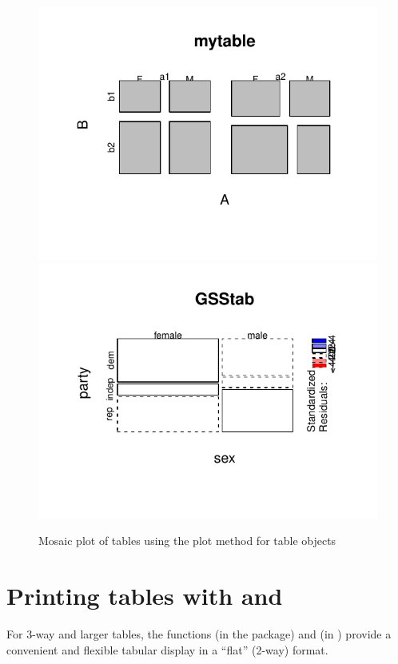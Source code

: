 \documentclass[11pt]{book}
\renewenvironment{knitrout}{\small\renewcommand{\baselinestretch}{.85}}{} %
\begin{document}
\begin{knitrout}
\color{fgcolor}\begin{kframe}
\begin{alltt}
 \hlstd{=}\hlstd{)}
\end{alltt}
\end{kframe}\begin{figure}[!htbp]


\centerline{\includegraphics[width=.48\textwidth]{ch02/fig/plot-xtab1} 
\includegraphics[width=.48\textwidth]{ch02/fig/plot-xtab2} }

\caption[Mosaic plot of tables using the plot method for table objects]{Mosaic plot of tables using the plot method for table objects\label{fig:plot-xtab}}
\end{figure}


\end{knitrout}



\section[Printing tables: structable and ftable]{Printing tables with  and }\label{sec:structable}

For 3-way and larger tables, the functions
 (in the  package) and
 (in ) provide a convenient and flexible tabular display in a ``flat'' (2-way) format.
\end{document}

